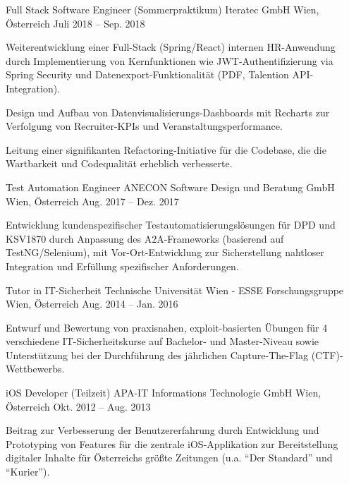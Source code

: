 \begin{cventries}
\cventry
{Full Stack Software Engineer (Sommerpraktikum)} %
{Iteratec GmbH} %
{Wien, Österreich} %
{Juli 2018 -- Sep. 2018} %
{ %
\begin{cvitems}
\item {Weiterentwicklung einer Full-Stack (Spring/React) internen HR-Anwendung durch Implementierung von Kernfunktionen wie JWT-Authentifizierung via Spring Security und Datenexport-Funktionalität (PDF, Talention API-Integration).}
\item {Design und Aufbau von Datenvisualisierungs-Dashboards mit Recharts zur Verfolgung von Recruiter-KPIs und Veranstaltungsperformance.}
\item {Leitung einer signifikanten Refactoring-Initiative für die Codebase, die die Wartbarkeit und Codequalität erheblich verbesserte.}
\end{cvitems}
}

\cventry
{Test Automation Engineer} %
{ANECON Software Design und Beratung GmbH} %
{Wien, Österreich} %
{Aug. 2017 -- Dez. 2017} %
{ %
\begin{cvitems}
\item {Entwicklung kundenspezifischer Testautomatisierungslösungen für DPD und KSV1870 durch Anpassung des A2A-Frameworks (basierend auf TestNG/Selenium), mit Vor-Ort-Entwicklung zur Sicherstellung nahtloser Integration und Erfüllung spezifischer Anforderungen.}
\end{cvitems}
}

\cventry
{Tutor in IT-Sicherheit} %
{Technische Universität Wien - ESSE Forschungsgruppe} %
{Wien, Österreich} %
{Aug. 2014 -- Jan. 2016} %
{ %
\begin{cvitems}
\item {Entwurf und Bewertung von praxisnahen, exploit-basierten Übungen für 4 verschiedene IT-Sicherheitskurse auf Bachelor- und Master-Niveau sowie Unterstützung bei der Durchführung des jährlichen Capture-The-Flag (CTF)-Wettbewerbs.}
\end{cvitems}
}

\cventry
{iOS Developer (Teilzeit)} %
{APA-IT Informations Technologie GmbH} %
{Wien, Österreich} %
{Okt. 2012 -- Aug. 2013} %
{ %
\begin{cvitems}
\item {Beitrag zur Verbesserung der Benutzererfahrung durch Entwicklung und Prototyping von Features für die zentrale iOS-Applikation zur Bereitstellung digitaler Inhalte für Österreichs größte Zeitungen (u.a. \enquote{Der Standard} und \enquote{Kurier}).}
\end{cvitems}
}

\end{cventries}